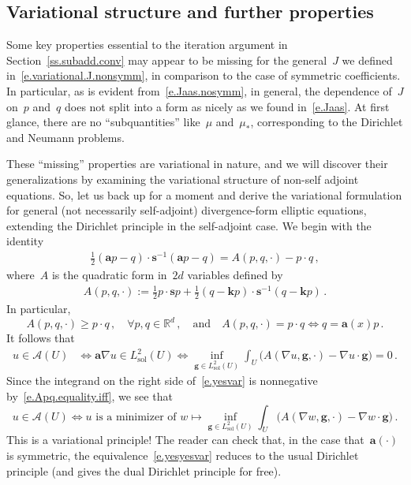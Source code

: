 \documentclass[11pt,twoside]{article} %
\numberwithin{equation}{section}
\theoremstyle{definition}
\newcommand*{\Rd}{\ensuremath{\mathbb{R}^d}}
\newcommand{\g}{\mathbf{g}}
\newcommand{\s}{\mathbf{s}}
\renewcommand{\a}{\mathbf{a}}
\renewcommand{\k}{\mathbf{k}}
\newcommand{\A}{\mathcal{A}}
\newcommand{\Lsol}{L^2_{\mathrm{sol}}}
\begin{document}
\subsection{Variational structure and further properties}
\label{ss.doublevar}

Some key properties essential to the iteration argument in Section~\ref{ss.subadd.conv} may appear to be missing for the general~$J$ we defined in~\eqref{e.variational.J.nonsymm}, in comparison to the case of symmetric coefficients. In particular, as is evident from~\eqref{e.Jaas.nosymm}, in general, the dependence of~$J$ on~$p$ and~$q$ does not split into a form as nicely as we found in~\eqref{e.Jaas}. At first glance, there are no ``subquantities'' like~$\mu$ and~$\mu_*$, corresponding to the Dirichlet and Neumann problems.

\smallskip

These ``missing'' properties are variational in nature, and we will discover their generalizations by examining the variational structure of non-self adjoint equations. So, let us back up for a moment and derive the variational formulation for general (not necessarily self-adjoint) divergence-form elliptic equations, extending the Dirichlet principle in the self-adjoint case. We begin with the identity
\begin{align*}
\frac12 (\a p - q) \cdot \s^{-1}  (\a p - q)
=
A(p,q,\cdot) - p\cdot q
\,,
\end{align*}
where~$A$ is the quadratic form in~$2d$ variables defined by
\begin{align}
\label{e.Apq.def}
A(p,q,\cdot) 
:=
\frac12 p\cdot \s p + \frac 12 (q-\k p) \cdot \s^{-1}(q-\k p)
\,.
\end{align}
In particular, 
\begin{equation}
\label{e.Apq.equality.iff}
A(p,q,\cdot) \geq p\cdot q\,,  \quad \forall p,q\in\Rd\,, 
\quad \mbox{and} \quad 
A(p,q,\cdot) = p\cdot q
\iff
q = \a(x) p \,.
\end{equation}
It follows that 
\begin{align}
\label{e.yesvar}
u\in \A(U) & \iff
\a\nabla u \in \Lsol(U)
\iff 
\inf_{\g \in \Lsol(U)}
\int_U 
\bigl( A(\nabla u,\g,\cdot) - \nabla u\cdot \g \bigr)
= 0
\,.
\end{align}
Since the integrand on the right side of~\eqref{e.yesvar} is nonnegative by~\eqref{e.Apq.equality.iff}, we see that 
\begin{equation}
\label{e.yesyesvar.local}
u\in \A(U) 
\iff
\text{$u$ is a minimizer of }
w\mapsto \inf_{\g \in \Lsol(U)}
\int_U 
\bigl( A(\nabla w,\g,\cdot) - \nabla w\cdot \g \bigr)
\,.
\end{equation}
This is a variational principle! The reader can check that, in the case that~$\a(\cdot)$ is symmetric, the equivalence~\eqref{e.yesyesvar} reduces to the usual Dirichlet principle (and gives the dual Dirichlet principle for free). 
\end{document}
